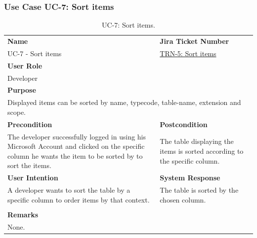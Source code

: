 
\subsubsection{Use Case UC-7: Sort items}\label{subsubsec:use-case-uc-7:-sort-items}

\begin{table}[H]
    \centering
    \begin{tabular}{|p{}|p{}|}

        \hline
        \rowcolor{gray!50}\textbf{Name} & \rowcolor{gray!50}\textbf{Jira Ticket Number} \\
        UC-7 - Sort items
        &
        \href{https://fh-burgenland.atlassian.net/browse/TRN-5}{TRN-5: Sort items} \\ \hline

        \multicolumn{2}{|l|}{\rowcolor{gray!50}\textbf{User Role}} \\
        \multicolumn{2}{|l|}{Developer} \\ \hline

        \multicolumn{2}{|l|}{\rowcolor{gray!50}\textbf{Purpose}} \\
        \multicolumn{2}{|p{1\textwidth}|}{Displayed items can be sorted by name, typecode, table-name, extension and scope.} \\ \hline

        \rowcolor{gray!50}\textbf{Precondition} & \rowcolor{gray!50}\textbf{Postcondition} \\
        The developer successfully logged in using his Microsoft Account and clicked on the specific column he wants the item to be sorted by to sort the items.
        &
        The table displaying the items is sorted according to the specific column. \\ \hline

        \rowcolor{gray!50}\textbf{User Intention} & \rowcolor{gray!50}\textbf{System Response} \\
        A developer wants to sort the table by a specific column to order items by that context.
        &
        The table is sorted by the chosen column. \\ \hline

        & \\ \hline

        \multicolumn{2}{|l|}{\rowcolor{gray!50}\textbf{Remarks}} \\
        \multicolumn{2}{|p{1\textwidth}|}{None.} \\ \hline
    \end{tabular}
    \caption{UC-7: Sort items.}
    \label{tab:uc-sort-items}
\end{table}

